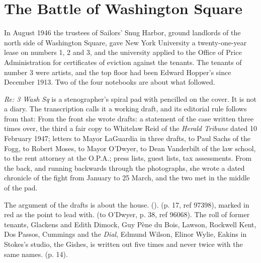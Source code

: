 \section{The Battle of Washington Square}

In August 1946 the trustees of Sailors' Snug Harbor, ground landlords of the north side of Washington Square, gave New York University a twenty-one-year lease on numbers 1, 2 and 3, and the university applied to the Office of Price Administration for certificates of eviction against the tenants. The tenants of number 3 were artists, and the top floor had been Edward Hopper's since December 1913. Two of the four notebooks are about what followed.

\emph{Re: 3 Wash Sq} is a stenographer's spiral pad with  pencilled on the cover. It is not a diary. The transcription calls it a working draft, and its editorial rule follows from that:  From the front she wrote drafts: a statement of the case written three times over, the third a fair copy to Whitelaw Reid of the \emph{Herald Tribune} dated 10 February 1947; letters to Mayor LaGuardia in three drafts, to Paul Sachs of the Fogg, to Robert Moses, to Mayor O'Dwyer, to Dean Vanderbilt of the law school, to the rent attorney at the O.P.A.; press lists, guest lists, tax assessments. From the back, and running backwards through the photographs, she wrote a dated chronicle of the fight from January to 25 March, and the two met in the middle of the pad.

The argument of the drafts is about the house.  ().  (p. 17, ref 97398), marked in red as the point to lead with.  (to O'Dwyer, p. 38, ref 96068). The roll of former tenants, Glackens and Edith Dimock, Guy Pène du Bois, Lawson, Rockwell Kent, Dos Passos, Cummings and the \emph{Dial}, Edmund Wilson, Elinor Wylie, Eakins in Stokes's studio, the Gishes, is written out five times and never twice with the same names.  (p. 14).

